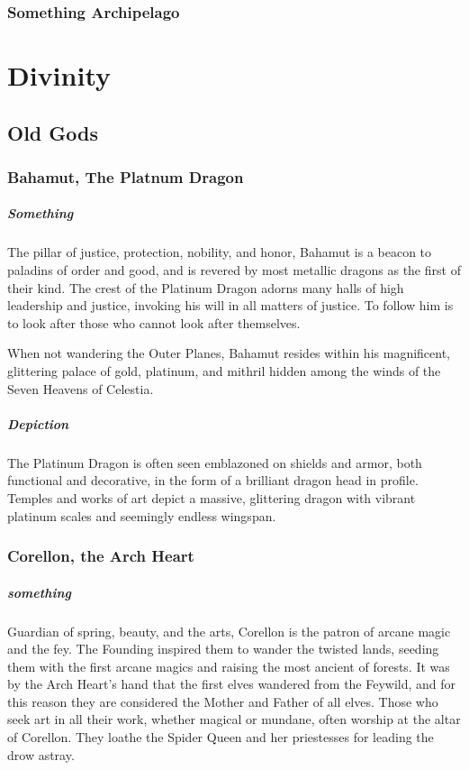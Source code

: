 \documentclass[letterpaper,twocolumn,openany,nodeprecatedcode]{dndbook}
\begin{document}
\subsection{Something Archipelago}

\chapter{Divinity}

\section{Old Gods}

\subsection{Bahamut, The Platnum Dragon}

\paragraph{Something}
The pillar of justice, protection, nobility, and honor, Bahamut is a beacon to
paladins of order and good, and is revered by most metallic dragons as the first of
their kind. The crest of the Platinum Dragon adorns many halls of high leadership and
justice, invoking his will in all matters of justice. To follow him is to look after
those who cannot look after themselves.

When not wandering the Outer Planes, Bahamut resides within his magnificent, glittering
palace of gold, platinum, and mithril hidden among the winds of the Seven Heavens of Celestia.

\paragraph{Depiction}
The Platinum Dragon is often seen emblazoned on shields and armor, both functional and
decorative, in the form of a brilliant dragon head in profile. Temples and works of art
depict a massive, glittering dragon with vibrant platinum scales and seemingly
endless wingspan.

\subsection{Corellon, the Arch Heart}

\paragraph{something}
Guardian of spring, beauty, and the arts, Corellon is the patron of arcane magic and
the fey. The Founding inspired them to wander the twisted lands, seeding them with the
first arcane magics and raising the most ancient of forests. It was by the Arch Heart’s
hand that the first elves wandered from the Feywild, and for this reason they are
considered the Mother and Father of all elves. Those who seek art in all their work,
whether magical or mundane, often worship at the altar of Corellon. They loathe the
Spider Queen and her priestesses for leading the drow astray.
\end{document}
